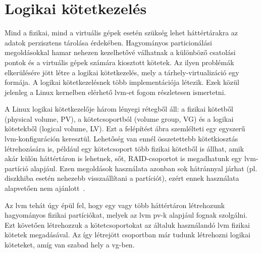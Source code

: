 \section{Logikai kötetkezelés}
\label{sect:lvm}
Mind a fizikai, mind a virtuális gépek esetén szükség lehet háttértárakra az adatok perzisztens tárolása érdekében. Hagyományos particionálási megoldásokkal hamar nehezen kezelhetővé válhatnak a különböző csatolási pontok és a virtuális gépek számára kiosztott kötetek. Az ilyen problémák elkerülésére jött létre a logikai kötetkezelés, mely a tárhely-virtualizáció egy formája. A logikai kötetkezelésnek több implementációja létezik. %
Ezek közül jelenleg a Linux kernelben elérhető \gls{lvm}-et fogom részletesen ismertetni.

A Linux logikai kötetkezelője három lényegi rétegből áll: a fizikai kötetből (physical volume, PV), a kötetcsoportból (volume group, VG) és a logikai kötetekből (logical volume, LV). Ezt a felépítést  ábra szemlélteti egy egyszerű \gls{lvm}-konfiguráción keresztül.
Lehetőség van ennél összetettebb kötetkiosztás létrehozására is, például egy kötetcsoport több fizikai kötetből is állhat, amik akár külön háttértáron is lehetnek, sőt, RAID-csoportot is megadhatunk egy \gls{lvm}-partíció alapjául. Ezen megoldások használata azonban sok hátránnyal járhat (pl. diszkhiba esetén nehezebb visszaállítani a partíciót), ezért ennek használata alapvetően nem ajánlott~\cite{RHLVM}.

Az \gls{lvm} tehát úgy épül fel, hogy egy vagy több háttértáron létrehozunk hagyományos fizikai partíciókat, melyek az \gls{lvm} \acrshort{pv}-k alapjául fognak szolgálni. Ezt követően létrehozzuk a kötetcsoportokat az általuk használandó \acrshort{lvm} fizikai kötetek megadásával. Az így létrejött csoportban már tudunk létrehozni logikai köteteket, amíg van szabad hely a \acrshort{vg}-ben.

